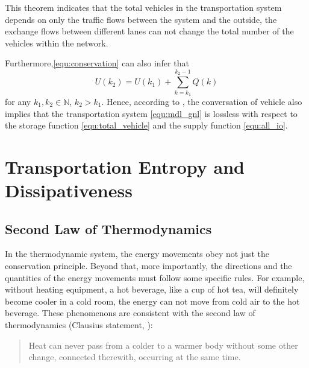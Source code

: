 \documentclass[preprint,authoryear,12pt]{elsarticle}
\begin{document}
This theorem indicates that the total vehicles in the transportation system depends on only the traffic flows between the system and the outside, the exchange flows between different lanes can not change the total number of the vehicles within the network.

Furthermore,\eqref{equ:conservation} can also infer that
\begin{equation}\label{equ:conservation_ex}
U(k_2) = U(k_1)+\sum_{k=k_1}^{k_2-1}Q(k)
\end{equation}
for any $k_1,k_2\in\mathbb{N}$, $k_2>k_1$. Hence, according to \citep{willems_dissipative_1972-1}, the conversation of vehicle also implies that the transportation system \eqref{equ:mdl_gnl} is lossless with respect to the storage function \eqref{equ:total_vehicle} and the supply function \eqref{equ:all_io}.

\section{Transportation Entropy and Dissipativeness}

\subsection{Second Law of Thermodynamics}

In the thermodynamic system, the energy movements obey not just the conservation principle. Beyond that, more importantly, the directions and the quantities of the energy movements must follow some specific rules. For example, without heating equipment, a hot beverage, like a cup of hot tea, will definitely become cooler in a cold room, the energy can not move from cold air to the hot beverage. These phenomenons are consistent with the second law of thermodynamics (Clausius statement, \citet{clausius_mechanical_1867}):
\begin{quotation}
Heat can never pass from a colder to a warmer body without some other change, connected therewith, occurring at the same time.
\end{quotation}
\end{document}
